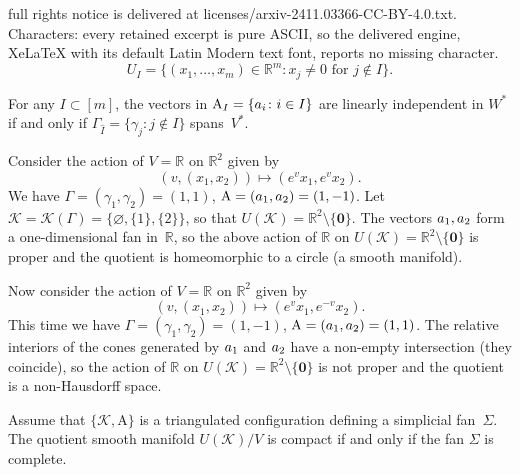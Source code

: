 \documentclass[10pt,a4paper]{amsart}
\def\R{\mathbb R}
\def\sK{\mathcal K}
\newcommand{\mb}[1]{{\textbf {\textit#1}}}
\begin{document}
full rights notice is delivered at licenses/arxiv-2411.03366-CC-BY-4.0.txt. Characters: every retained excerpt is pure ASCII, so the delivered engine, XeLaTeX with its default Latin Modern text font, reports no missing character.
\begin{equation}\label{affui}
  U_I=\{(x_1,\ldots,x_m)\in\R^m\colon x_j\ne0\text{ for }j\notin I\}.
\end{equation}

\begin{proposition}\label{galeindspan}
For any $I\subset[m]$, the vectors in $\mathrm{A}_I=\{\mb a_i\colon i\in I\}$ are linearly independent in $W^*$ if and only if $\Gamma_{\widehat I}=\{\gamma_j\colon j\notin I\}$ spans~$V^*$.  
\end{proposition}

\begin{example}\label{1dimfan}
Consider the action of $V=\R$ on $\R^2$ given by 
\[
  (v,(x_1,x_2))\mapsto(e^{v}x_1,e^{v}x_2).
\]
We have $\Gamma=(\gamma_1,\gamma_2)=(1,1)$, $\mathrm A=(\mb a_1,\mb a_2)=(1,-1)$. Let $\sK=\sK(\Gamma)=\{\varnothing,\{1\},\{2\}\}$, so that $U(\sK)=\R^2\setminus\{\mathbf 0\}$.
The vectors $\mb a_1,\mb a_2$ form a one-dimensional fan in~$\R$, so the above action of $\R$ on $U(\sK)=\R^2\setminus\{\mathbf 0\}$ is proper and the quotient is homeomorphic to a circle (a smooth manifold).

Now consider the action of $V=\R$ on $\R^2$ given by 
\[
  (v,(x_1,x_2))\mapsto(e^{v}x_1,e^{-v}x_2).
\]
This time we have $\Gamma=(\gamma_1,\gamma_2)=(1,-1)$, $\mathrm A=(\mb a_1,\mb a_2)=(1,1)$.
The relative interiors of the cones generated by $\mb a_1$ and $\mb a_2$ have a non-empty intersection (they coincide), so the action of $\R$ on $U(\sK)=\R^2\setminus\{\mathbf 0\}$ is not proper and the quotient is a non-Hausdorff space.
\end{example}

\begin{theorem}\label{comcom}
Assume that $\{\mathcal K,\mathrm A\}$ is a triangulated configuration defining a simplicial fan~$\Sigma$.
The quotient smooth manifold $U(\sK)/V$ is compact if and only if the fan $\Sigma$ is complete.
\end{theorem}
\end{document}
